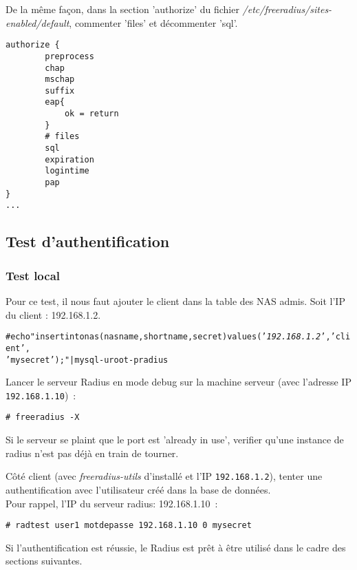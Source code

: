 De la même façon, dans la section 'authorize' du fichier \emph{/etc/freeradius/sites-enabled/default}, commenter 'files' et décommenter 'sql'.
\begin{verbatim}
authorize {
        preprocess
        chap
        mschap
        suffix
        eap{
            ok = return
        }
        # files
        sql
        expiration
        logintime
        pap
}
...
\end{verbatim}


\subsection{Test d'authentification}
\subsubsection{Test local}
Pour ce test, il nous faut ajouter le client dans la table des NAS admis. Soit l'IP du client : 192.168.1.2.
\begin{alltt}
# echo "insert into nas(nasname,shortname,secret) values ('\emph{192.168.1.2}','client',\\'mysecret'); " | mysql -uroot -p radius
\end{alltt}

Lancer le serveur Radius en mode debug sur la machine serveur (avec l'adresse IP \texttt{192.168.1.10})~:
\begin{verbatim}
# freeradius -X
\end{verbatim}
Si le serveur se plaint que le port est 'already in use', verifier qu'une instance de radius n'est pas déjà en train de tourner.

Côté client (avec \emph{freeradius-utils} d'installé et l'IP \texttt{192.168.1.2}), tenter une authentification avec l'utilisateur créé dans la base de données.\\
Pour rappel, l'IP du serveur radius: 192.168.1.10~:
\begin{verbatim}
# radtest user1 motdepasse 192.168.1.10 0 mysecret
\end{verbatim}

Si l'authentification est réussie, le Radius est prêt à être utilisé dans le cadre des sections suivantes.

